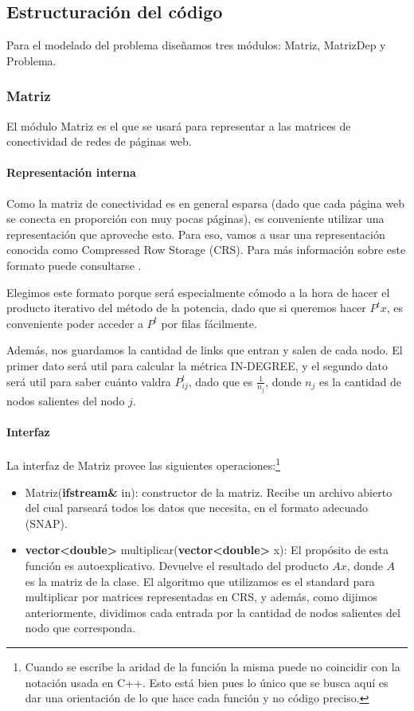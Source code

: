 \subsection{Estructuración del código}
Para el modelado del problema diseñamos tres módulos: Matriz, MatrizDep y Problema. 


\subsubsection{Matriz}
El módulo Matriz es el que se usará para representar a las matrices de conectividad de redes de páginas web.
\paragraph{Representación interna}

Como la matriz de conectividad es en general esparsa (dado que cada página web se conecta en proporción con muy pocas páginas), es conveniente utilizar una representación que aproveche esto. Para eso, vamos a usar una representación conocida como Compressed Row Storage (CRS). Para más información sobre este formato puede consultarse \cite{CRS}.

Elegimos este formato porque será especialmente cómodo a la hora de hacer el producto iterativo del método de la potencia, dado que si queremos hacer $P^tx$, es conveniente poder acceder a $P^t$ por filas fácilmente. 

Además, nos guardamos la cantidad de links que entran y salen de cada nodo. El primer dato será util para calcular la métrica IN-DEGREE, y el segundo dato será util para saber cuánto valdra $P^t_{ij}$, dado que es $\frac{1}{n_j}$, donde $n_j$ es la cantidad de nodos salientes del nodo $j$.

\paragraph{Interfaz}
La interfaz de Matriz provee las siguientes operaciones:\footnote{Cuando se escribe la aridad de la función la misma puede no coincidir con la notación usada en C++. Esto está bien pues lo único que se busca aquí es dar una orientación de lo que hace cada función y no código preciso.}

\begin{itemize}
    \item Matriz(\textbf{ifstream\&} in): constructor de la matriz. Recibe un archivo abierto del cual parseará todos los datos que necesita, en el formato adecuado (SNAP).

    \item \textbf{vector<double>} multiplicar(\textbf{vector<double>} x): El propósito de esta función es autoexplicativo. Devuelve el resultado del producto $Ax$, donde $A$ es la matriz de la clase. El algoritmo que utilizamos es el standard para multiplicar por matrices representadas en CRS, y además, como dijimos anteriormente, dividimos cada entrada por la cantidad de nodos salientes del nodo que corresponda.
\end{itemize}

